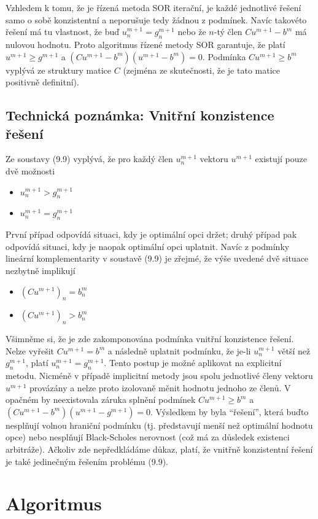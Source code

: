 \documentclass[a4paper]{book}
\begin{document}
Vzhledem k tomu, že je řízená metoda SOR iterační, je každé jednotlivé řešení samo o sobě konzistentní a neporušuje tedy žádnou z podmínek. Navíc takovéto řešení má tu vlastnost, že buď $u_n^{m+1} = g_n^{m+1}$ nebo že $n$-tý člen $Cu^{m+1}-b^m$ má nulovou hodnotu. Proto algoritmus řízené metody SOR garantuje, že platí $u^{m+1} \ge g^{m+1}$ a $(Cu^{m+1}-b^m)(u^{m+1}-b^m)=0$. Podmínka $Cu^{m+1} \ge b^m$ vyplývá ze struktury matice $C$ (zejména ze skutečnosti, že je tato matice positivně definitní).

\subsection{Technická poznámka: Vnitřní konzistence řešení}

Ze soustavy (9.9) vyplývá, že pro každý člen $u_n^{m+1}$ vektoru $u^{m+1}$ existují pouze dvě možnosti
\begin{itemize}
\item $u_n^{m+1} > g_n^{m+1}$
\item $u_n^{m+1} = g_n^{m+1}$
\end{itemize}
První případ odpovídá situaci, kdy je optimální opci držet; druhý případ pak odpovídá situaci, kdy je naopak optimální opci uplatnit. Navíc z podmínky lineární komplementarity v soustavě (9.9) je zřejmé, že výše uvedené dvě situace nezbytně implikují
\begin{itemize}
\item $(Cu^{m+1})_n = b_n^m$
\item $(Cu^{m+1})_n > b_n^m$
\end{itemize}
Všimněme si, že je zde zakomponována podmínka vnitřní konzistence řešení. Nelze vyřešit $Cu^{m+1} = b^m$ a následně uplatnit podmínku, že je-li $u_n^{m+1}$ větší než $g_n^{m+1}$, platí $u_n^{m+1}=g_n^{m+1}$. Tento postup je možné aplikovat na explicitní metodu. Nicméně v případě implicitní metody jsou spolu jednotlivé členy vektoru $u^{m+1}$ provázány a nelze proto izolovaně měnit hodnotu jednoho ze členů. V opačném by neexistovala záruka splnění podmínek $Cu^{m+1} \ge b^m$ a $(Cu^{m+1}-b^m)(u^{m+1}-g^{m+1})=0$. Výsledkem by byla ``řešení'', která buďto nesplňují volnou hraniční podmínku (tj. představují menší než optimální hodnotu opce) nebo nesplňují Black-Scholes nerovnost (což má za důsledek existenci arbitráže). Ačkoliv zde nepředkládáme důkaz, platí, že vnitřně konzistentní řešení je také jedinečným řešením problému (9.9).

\section{Algoritmus}
\end{document}
